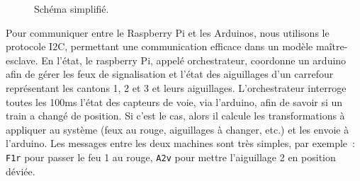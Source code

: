 \documentclass[oneside, a4paper, 11pt]{book}
\begin{document}
\begin{figure}[h]
	\centering
	\caption{Schéma simplifié.}
	\label{fig:prototype}
\end{figure}

Pour communiquer entre le Raspberry Pi et les Arduinos, nous utilisons le protocole I2C, permettant une communication efficace dans un modèle maître-esclave.
En l'état, le raspberry Pi, appelé orchestrateur, coordonne un arduino afin de gérer les feux de signalisation et l'état des aiguillages d'un carrefour représentant les cantons 1, 2 et 3 et leurs aiguillages.
L'orchestrateur interroge toutes les 100ms l'état des capteurs de voie, via l'arduino, afin de savoir si un train a changé de position. Si c'est le cas, alors il calcule les transformations à appliquer au système (feux au rouge, aiguillages à changer, etc.) et les envoie à l'arduino.
Les messages entre les deux machines sont très simples, par exemple~: \texttt{F1r} pour passer le feu 1 au rouge, \texttt{A2v} pour mettre l'aiguillage 2 en position déviée.

\end{document}
